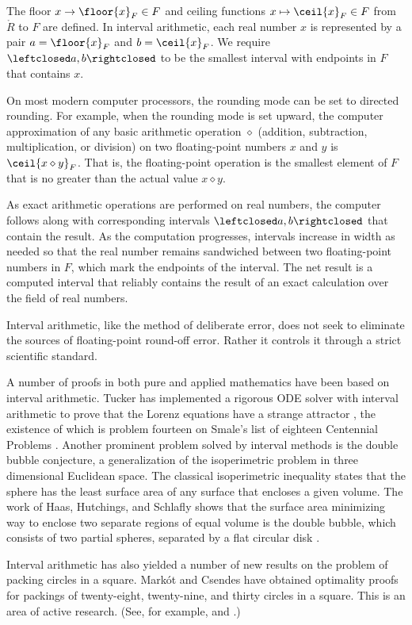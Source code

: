 The floor $x\to\floor{x}_F\in F$ and ceiling functions
$x\mapsto\ceil{x}_F\in F$ from $\ring{R}$ to $F$ are defined.  In
interval arithmetic, each real number $x$ is represented by a pair
$a=\floor{x}_F$ and $b=\ceil{x}_F$. We require $\leftclosed
a,b\rightclosed$ to be the smallest interval with endpoints in $F$
that contains $x$.

On most modern computer processors, the rounding mode can be set to
directed rounding.  For example, when the rounding mode is set upward,
the computer approximation of any basic arithmetic operation
$\diamond$ (addition, subtraction, multiplication, or division) on two
floating-point numbers $x$ and $y$ is $\ceil{x\diamond y}_F$.  That
is, the floating-point operation is the smallest element of $F$ that
is no greater than the actual value $x\diamond y$.

As exact arithmetic operations are performed on real numbers, the
computer follows along with corresponding intervals $\leftclosed
a,b\rightclosed$ that contain the result.  As the computation
progresses, intervals increase in width as needed so that the real
number remains sandwiched between two floating-point numbers in $F$,
which mark the endpoints of the interval.  The net result is a
computed interval that reliably contains the result of an exact
calculation over the field of real numbers.

Interval arithmetic, like the method of deliberate error, does not
seek to eliminate the sources of floating-point round-off error.
Rather it controls it through a strict scientific standard.


A number of proofs in both pure and applied mathematics have been
based on interval arithmetic.  Tucker has implemented a rigorous ODE
solver with interval arithmetic to prove that the Lorenz equations
have a strange attractor \cite{Tuc02}, the existence of which is
problem fourteen on Smale's list of eighteen Centennial Problems
\cite{Sma98}.  Another prominent problem solved by interval methods is
the double bubble conjecture, a generalization of the isoperimetric
problem in three dimensional Euclidean space.  The classical
isoperimetric inequality states that the sphere has the least surface
area of any surface that encloses a given volume.  The work of Haas,
Hutchings, and Schlafly shows that the surface area minimizing way to
enclose two separate regions of equal volume is the double bubble,
which consists of two partial spheres, separated by a flat circular
disk \cite{HHS95}.

Interval arithmetic has also yielded a number of new results on the
problem of packing circles in a square.  Mark\'ot and Csendes have
obtained optimality proofs for packings of twenty-eight, twenty-nine,
and thirty circles in a square.  
This is an area of active research. (See, for example, \cite{Sza07}
and \cite{Mark07}.)


